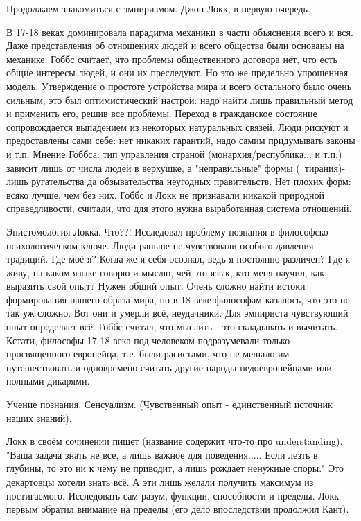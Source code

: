 Продолжаем знакомиться с эмпиризмом.
Джон Локк, в первую очередь.

В 17-18 веках доминировала парадигма механики в части объяснения всего и вся. Даже представления об отношениях людей и всего общества были основаны на механике. Гоббс считает, что проблемы общественного договора нет, что есть общие интересы людей, и они их преследуют. Но это же предельно упрощенная модель. Утверждение о простоте устройства мира и всего остального было очень сильным, это был оптимистический настрой: надо найти лишь правильный метод и применить его, решив все проблемы.
Переход в гражданское состояние сопровождается выпадением из некоторых натуральных связей. Люди рискуют и предоставлены сами себе: нет никаких гарантий, надо самим придумывать законы и т.п.
Мнение Гоббса: тип управления страной (монархия/республика... и т.п.) зависит лишь от числа людей в верхушке, а "неправильные" формы (~тирания)- лишь ругательства да обзывательства неугодных правительств. Нет плохих форм: всяко лучше, чем без них.
Гоббс и Локк не признавали никакой природной справедливости, считали, что для этого нужна выработанная система отношений.

Эпистомология Локка. Что??!
Исследовал проблему познания в философско-психологическом ключе. Люди раньше не чувствовали особого давления традиций. Где моё я? Когда же я себя осознал, ведь я постоянно различен? Где я живу, на каком языке говорю и мыслю, чей это язык, кто меня научил, как выразить свой опыт? Нужен общий опыт. Очень сложно найти истоки формирования нашего образа мира, но в 18 веке философам казалось, что это не так уж сложно. Вот они и умерли всё, неудачники. Для эмпириста чувствующий опыт определяет всё. Гоббс считал, что мыслить - это складывать и вычитать. Кстати, философы 17-18 века под человеком подразумевали только просвященного европейца, т.е. были расистами, что не мешало им путешествовать и одновремено считать другие народы недоевропейцами или полными дикарями.

Учение познания. Сенсуализм. (Чувственный опыт - единственный источник наших знаний).

Локк в своём сочинении пишет (название содержит что-то про understanding). "Ваша задача знать не все, а лишь важное для поведения..... Если лезть в глубины, то это ни к чему не приводит, а лишь рождает ненужные споры." Это декартовцы хотели знать всё. А эти лишь желали получить максимум из постигаемого. Исследовать сам разум, функции, способности и пределы. Локк первым обратил внимание на пределы (его дело впоследствии продолжил Кант).

